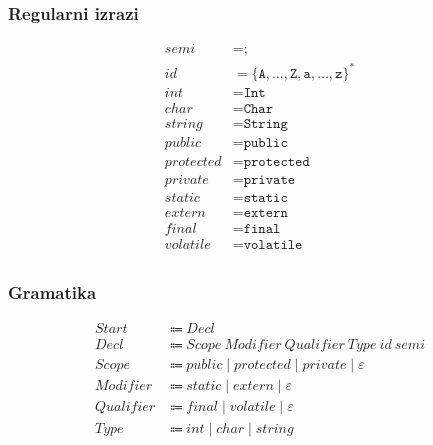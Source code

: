\documentclass{report}
\newcommand{\Null}{\varepsilon}
\newcommand{\Char}[1]{\texttt{#1}}
\newcommand{\Spc}{\ }
\newcommand{\Union}{\mathrel{|}}
\newcommand{\Kleene}[1]{{#1}^\ast}
\newcommand{\Arrow}{\Coloneq}
\newcommand{\NT}[1]{{#1}}
\newcommand{\T}[1]{{#1}}
\begin{document}
    \subsubsection*{Regularni izrazi}
    \begin{equation*}
      \begin{aligned}
        \T{semi} &= \Char{;}\\
        \T{id} &= \Kleene{\{\Char{A}, \dots, \Char{Z}, \Char{a}, \dots, \Char{z}\}}\\
        \T{int} &= \Char{Int}\\
        \T{char} &= \Char{Char}\\
        \T{string} &= \Char{String}\\
        \T{public} &= \Char{public}\\
        \T{protected} &= \Char{protected}\\
        \T{private} &= \Char{private}\\
        \T{static} &= \Char{static}\\
        \T{extern} &= \Char{extern}\\
        \T{final} &= \Char{final}\\
        \T{volatile} &= \Char{volatile}\\
      \end{aligned}
    \end{equation*}

    \subsubsection*{Gramatika}
    \begin{equation*}
      \begin{aligned}
        \NT{Start} &\Arrow \NT{Decl}\\
        \NT{Decl} &\Arrow \NT{Scope} \Spc \NT{Modifier} \Spc \NT{Qualifier} \Spc \NT{Type} \Spc \T{id} \Spc \T{semi}\\
        \NT{Scope} &\Arrow \T{public} \Union \T{protected} \Union \T{private} \Union \Null\\
        \NT{Modifier} &\Arrow \T{static} \Union \T{extern} \Union \Null\\
        \NT{Qualifier} &\Arrow \T{final} \Union \T{volatile} \Union \Null\\
        \NT{Type} &\Arrow \T{int} \Union \T{char} \Union \T{string}\\
      \end{aligned}
    \end{equation*}
\end{document}
